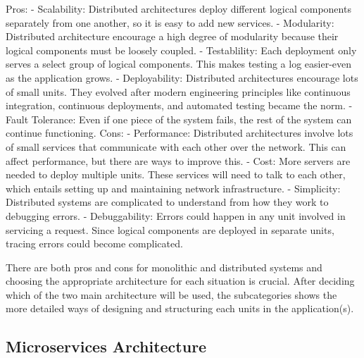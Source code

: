 Pros:
-	Scalability: Distributed architectures deploy different logical components separately from one another, so it is easy to add new services.
-	Modularity: Distributed architecture encourage a high degree of modularity because their logical components must be loosely coupled.
-	Testablility: Each deployment only serves a select group of logical components. This makes testing a log easier-even as the application grows.
-	Deployability: Distributed architectures encourage lots of small units. They evolved after modern engineering principles like continuous integration, 
  continuous deployments, and automated testing became the norm.
-	Fault Tolerance: Even if one piece of the system fails, the rest of the system can continue functioning.
Cons:
-	Performance: Distributed architectures involve lots of small services that communicate with each other over the network.
  This can affect performance, but there are ways to improve this.
-	Cost: More servers are needed to deploy multiple units. These services will need to talk to each other, which entails setting up and maintaining network infrastructure.
-	Simplicity: Distributed systems are complicated to understand from how they work to debugging errors.
-	Debuggability: Errors could happen in any unit involved in servicing a request. Since logical components are deployed in separate units,
  tracing errors could become complicated.

There are both pros and cons for monolithic and distributed systems and choosing the appropriate architecture for each situation is crucial.
After deciding which of the two main architecture will be used, the subcategories shows the more detailed ways of designing and structuring each units in the application(s). 

\subsection[Microservices Architecture]{Microservices Architecture}

